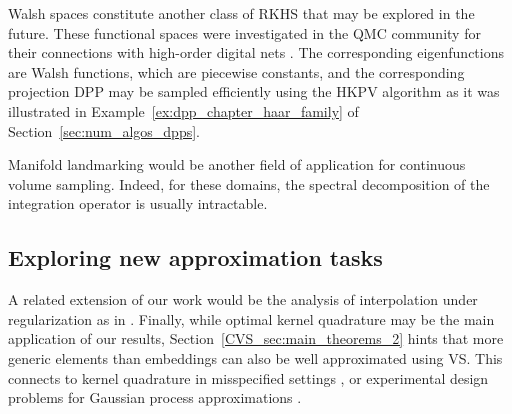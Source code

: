 \documentclass[twoside,11pt]{book}
\numberwithin{theorem}{chapter}
\numberwithin{definition}{chapter}
\numberwithin{proposition}{chapter}
\numberwithin{corollary}{chapter}
\numberwithin{example}{chapter}
\numberwithin{lemma}{chapter}
\numberwithin{assumption}{chapter}
\numberwithin{equation}{chapter}
\numberwithin{figure}{chapter}
\begin{document}

Walsh spaces constitute another class of RKHS that may be explored in the future. These functional spaces were investigated in the QMC community for their connections with high-order digital nets \parencite{Dic08}. The corresponding eigenfunctions are Walsh functions, which are piecewise constants, and  the corresponding projection DPP may be sampled efficiently using the HKPV algorithm as it was illustrated in Example~\ref{ex:dpp_chapter_haar_family} of Section~\ref{sec:num_algos_dpps}. 

Manifold landmarking \citep*{GaKoDa19}\citep*{EhGrCh19} would be another field of application for continuous volume sampling. Indeed, for these domains, the spectral decomposition of  the integration operator is usually intractable.










\subsection{Exploring new approximation tasks}\label{sec:conclusion_new_tasks}
A related extension of our work would be the analysis of interpolation under regularization as in \parencite{Bac17}.
Finally, while optimal kernel quadrature may be the main application of our results, Section~\ref{CVS_sec:main_theorems_2} hints that more generic elements than embeddings can also be well approximated using VS. This connects to kernel quadrature in misspecified settings \parencite{KaSrFu16}, or experimental design problems for Gaussian process approximations \parencite{WyBrGi20}.
\end{document}
